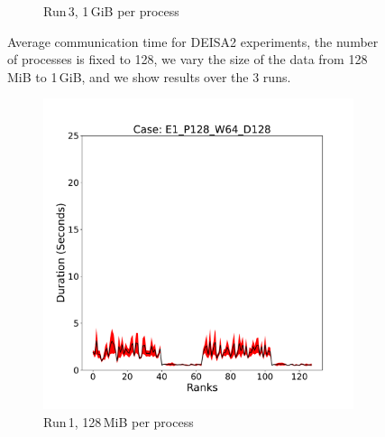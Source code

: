 \begin{figure}[h!]
\begin{subfigure}[b]{0.3\textwidth}
         \caption{Run\,3, 1\,GiB per process}
         \label{fig:E3_1_d2}
     \end{subfigure}
        \caption{Average communication time for DEISA2 experiments, the number of processes is fixed to 128, we vary the size of the data from 128\,MiB to 1\,GiB, and we show results over the 3 runs.}
        \label{fig:variability2}
\end{figure}

\begin{figure}[h!]
     \centering
     \begin{subfigure}[b]{0.3\textwidth}
         \centering
         \includegraphics[width=\textwidth, height=\textwidth]{figures/deisa1__E1_P128_W64_D128.pdf}
         \caption{Run\,1, 128\,MiB per process}
         \label{fig:E1_128_d11}
     \end{subfigure}
     \hfill
     \begin{subfigure}[b]{0.3\textwidth}
         \centering

\end{subfigure}
\end{figure}
